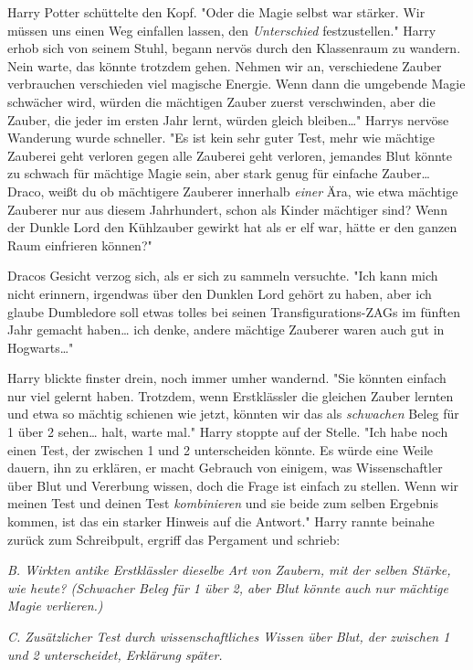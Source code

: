{Harry Potter schüttelte den Kopf. "Oder die Magie selbst war stärker. Wir müssen uns einen Weg einfallen lassen, den \emph{Unterschied} festzustellen." Harry erhob sich von seinem Stuhl, begann nervös durch den Klassenraum zu wandern. Nein warte, das könnte trotzdem gehen. Nehmen wir an, verschiedene Zauber verbrauchen verschieden viel magische Energie. Wenn dann die umgebende Magie schwächer wird, würden die mächtigen Zauber zuerst verschwinden, aber die Zauber, die jeder im ersten Jahr lernt, würden gleich bleiben…" Harrys nervöse Wanderung wurde schneller. "Es ist kein sehr guter Test, mehr wie mächtige Zauberei geht verloren gegen alle Zauberei geht verloren, jemandes Blut könnte zu schwach für mächtige Magie sein, aber stark genug für einfache Zauber… Draco, weißt du ob mächtigere Zauberer innerhalb \emph{einer} Ära, wie etwa mächtige Zauberer nur aus diesem Jahrhundert, schon als Kinder mächtiger sind? Wenn der Dunkle Lord den Kühlzauber gewirkt hat als er elf war, hätte er den ganzen Raum einfrieren können?"

Dracos Gesicht verzog sich, als er sich zu sammeln versuchte. "Ich kann mich nicht erinnern, irgendwas über den Dunklen Lord gehört zu haben, aber ich glaube Dumbledore soll etwas tolles bei seinen Transfigurations-ZAGs im fünften Jahr gemacht haben… ich denke, andere mächtige Zauberer waren auch gut in Hogwarts…"

Harry blickte finster drein, noch immer umher wandernd. "Sie könnten einfach nur viel gelernt haben. Trotzdem, wenn Erstklässler die gleichen Zauber lernten und etwa so mächtig schienen wie jetzt, könnten wir das als \emph{schwachen} Beleg für 1 über 2 sehen… halt, warte mal." Harry stoppte auf der Stelle. "Ich habe noch einen Test, der zwischen 1 und 2 unterscheiden könnte. Es würde eine Weile dauern, ihn zu erklären, er macht Gebrauch von einigem, was Wissenschaftler über Blut und Vererbung wissen, doch die Frage ist einfach zu stellen. Wenn wir meinen Test und deinen Test \emph{kombinieren} und sie beide zum selben Ergebnis kommen, ist das ein starker Hinweis auf die Antwort." Harry rannte beinahe zurück zum Schreibpult, ergriff das Pergament und schrieb:

\emph{B. Wirkten antike Erstklässler dieselbe Art von Zaubern, mit der selben Stärke, wie heute? (Schwacher Beleg für 1 über 2, aber Blut könnte auch nur mächtige Magie verlieren.)}

\emph{C. Zusätzlicher Test durch wissenschaftliches Wissen über Blut, der zwischen 1 und 2 unterscheidet, Erklärung später.}

}
